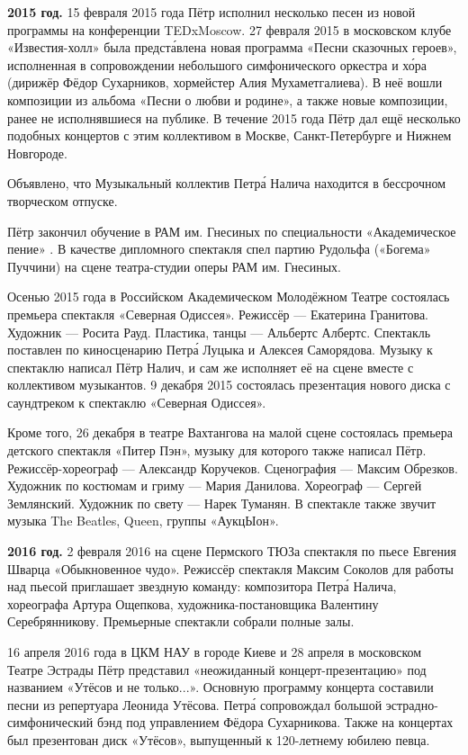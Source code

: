 \textbf{2015 год.}
15 февраля 2015 года Пётр исполнил несколько песен из новой программы на конференции TEDxMoscow. 27 февраля 2015 в московском клубе «Известия-холл» была предст\'{а}влена новая программа «Песни сказочных героев», исполненная в сопровождении небольшого симфонического оркестра и х\'{о}ра (дирижёр Фёдор Сухарников, хормейстер Алия Мухаметгалиева). В неё вошли композиции из альбома «Песни о любви и родине», а также новые композиции, ранее не исполнявшиеся на публике. В течение 2015 года Пётр дал ещё несколько подобных концертов с этим коллективом в Москве, Санкт-Петербурге и Нижнем Новгороде.

Объявлено, что Музыкальный коллектив Петр\'{а} Налича находится в бессрочном творческом отпуске.

Пётр закончил обучение в РАМ им. Гнесиных по специальности «Академическое пение» . В качестве дипломного спектакля спел партию Рудольфа («Богема» Пуччини) на сцене театра-студии оперы РАМ им. Гнесиных.

Осенью 2015 года в Российском Академическом Молодёжном Театре состоялась премьера спектакля «Северная Одиссея». Режиссёр --- Екатерина Гранитова. Художник --- Росита Рауд. Пластика, танцы --- Альбертс Албертс. Спектакль поставлен по киносценарию Петр\'{а} Луцыка и Алексея Саморядова. Музыку к спектаклю написал Пётр Налич, и сам же исполняет её на сцене вместе с коллективом музыкантов. 9 декабря 2015 состоялась презентация нового диска с саундтреком к спектаклю «Северная Одиссея».

Кроме того, 26 декабря в театре Вахтангова на малой сцене состоялась премьера детского спектакля «Питер Пэн», музыку для которого также написал Пётр. Режиссёр-хореограф --- Александр Коручеков. Сценография --- Максим Обрезков. Художник по костюмам и гриму --- Мария Данилова. Хореограф --- Сергей Землянский. Художник по свету --- Нарек Туманян. В спектакле также звучит музыка The Beatles, Queen, группы «АукцЫон».

\textbf{2016 год.}
2 февраля 2016 на сцене Пермского ТЮЗа  спектакля по пьесе Евгения Шварца «Обыкновенное чудо». Режиссёр спектакля Максим Соколов для работы над пьесой приглашает звездную команду: композитора Петр\'{а} Налича, хореографа Артура Ощепкова, художника-постановщика Валентину Серебрянникову. Премьерные спектакли собрали полные залы.

16 апреля 2016 года в ЦКМ НАУ в городе Киеве и 28 апреля в московском Театре Эстрады Пётр представил «неожиданный концерт-презентацию» под названием «Утёсов и не только...». Основную программу концерта составили песни из репертуара Леонида Утёсова. Петр\'{а} сопровождал большой эстрадно-симфонический бэнд под управлением Фёдора Сухарникова. Также на концертах был презентован диск «Утёсов», выпущенный к 120-летнему юбилею певца.

